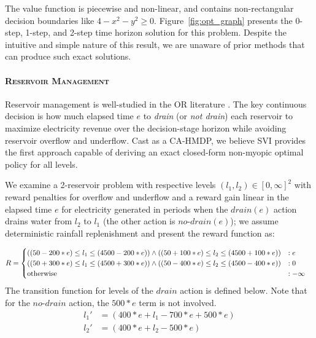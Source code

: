 \documentclass[twoside,11pt]{article}
\newcommand{\WaterReservoir}{\textsc{Reservoir Management }}
\begin{document}
The value function is piecewise and non-linear, and contains non-rectangular decision
boundaries like $4 -x^2 -y^2\geq 0$. Figure~\ref{fig:opt_graph} presents the  0-step, 1-step, and 2-step time horizon solution for this problem. Despite the intuitive and simple nature of this result, we are unaware of prior methods that can produce such exact solutions. 

\paragraph{\WaterReservoir} 
Reservoir management is well-studied in
the OR literature \cite{Mahootchi2009,Yeh1985}.  The key continuous decision is how
much elapsed time $e$ to
\emph{drain} (or \emph{not drain}) each reservoir to maximize
electricity revenue over the decision-stage horizon while avoiding
reservoir overflow and underflow.  Cast as a CA-HMDP, we 
believe SVI provides the first approach capable of deriving
an exact closed-form non-myopic optimal policy
for all levels.

We examine a 2-reservoir problem with
respective levels $(l_1,l_2)\in [0,\infty]^2$ with reward penalties for 
overflow and underflow and a reward gain linear in the elapsed time $e$ for
electricity generated in periods when the $\mathit{drain}(e)$ action
drains water from $l_2$ to $l_1$ (the other action is 
$\mathit{no}$-$\mathit{drain}(e)$); we assume deterministic rainfall
replenishment and present the reward function as:  

\vspace{-4mm}
{\footnotesize
\begin{align*}
R & = \begin{cases}
((50-200*e) \leq l_1 \leq (4500-200*e)) \wedge ((50+100*e) \leq l_2 \leq (4500+100*e)) %
&:e\\
((50+300*e) \leq l_1 \leq (4500+300*e)) \wedge ((50-400*e) \leq l_2 \leq (4500-400*e)) %
&:0\\
\text{\normalsize otherwise} &: -\infty \\
\end{cases}
\end{align*}}
The transition function for levels of the $\mathit{drain}$ action is defined below. Note that for the $\mathit{no}$-$\mathit{drain}$ action, the $\mathit{500 * e}$ term is not involved.
{%
\begin{align*}
l_1' & =(400 * e + l_1 -700 * e + 500 * e) \\
l_2'& =(400 * e + l_2 - 500 * e) \\
\end{align*}}
\end{document}
